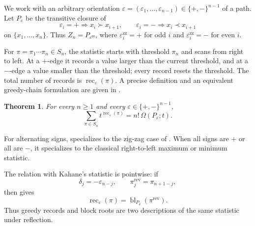 \documentclass[11pt,letterpaper,reqno]{amsart}
\newtheorem{theorem}{Theorem}[section]
\theoremstyle{definition}
\DeclareMathOperator{\rec}{rec}
\newcommand{\eps}{\varepsilon}
\begin{document}
We work with an arbitrary orientation
\(\eps=(\eps_1,\ldots,\eps_{n-1})\in\{+,-\}^{n-1}\) of a path.  Let
\(P_\eps\) be the transitive closure of
\[
\eps_i=+ \Longrightarrow x_i\succ x_{i+1},
\qquad
\eps_i=- \Longrightarrow x_i\prec x_{i+1}
\]
on \(\{x_1,\ldots,x_n\}\).  Thus \(Z_n=P_{\eps^{\mathrm{zz}}}\), where
\(\eps_i^{\mathrm{zz}}=+\) for odd \(i\) and \(\eps_i^{\mathrm{zz}}=-\) for
even \(i\).

For \(\pi=\pi_1\cdots\pi_n\in S_n\), the statistic starts with threshold
\(\pi_n\) and scans from right to left.  At a \(+\)-edge it records a value
larger than the current threshold, and at a \(-\)-edge a value smaller than
the threshold; every record resets the threshold.  The total number of
records is \(\rec_\eps(\pi)\).  A precise definition and an equivalent
greedy-chain formulation are given in
.

\begin{theorem}\label{thm:main-general}
For every \(n\ge1\) and every \(\eps\in\{+,-\}^{n-1}\),
\[
\sum_{\pi\in S_n} t^{\rec_\eps(\pi)}
=
n!\,\Omega(P_\eps;t).
\]
\end{theorem}

For alternating signs,  specializes to the zig-zag case
of \cite[Problem~5.3]{FMP}.  When all signs are \(+\) or all are \(-\), it
specializes to the classical right-to-left maximum or minimum statistic.

The relation with Kahane's statistic is pointwise: if
\[
\delta_j=-\eps_{n-j},
\qquad
\pi^{\mathrm{rev}}_j=\pi_{n+1-j},
\]
then  gives
\[
\rec_\eps(\pi)
=\operatorname{bl}_{P_\delta}(\pi^{\mathrm{rev}}).
\]
Thus greedy records and block roots are two descriptions of the same
statistic under reflection.
\end{document}
